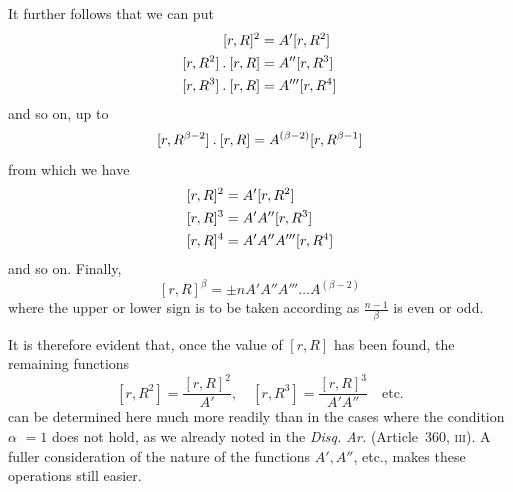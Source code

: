 It further follows that we can put
\[
\begin{aligned}
\relax[r,R]^2&=A'[r,R^2]\\
\relax[r,R^2]\mathbin{.}[r,R]&=A''[r,R^3]\\
\relax[r,R^3]\mathbin{.}[r,R]&=A'''[r,R^4]
\end{aligned}
\]
and so on, up to
\[
[r,R^{\beta-2}]\mathbin{.}[r,R]=A^{(\beta-2)}[r,R^{\beta-1}]
\]
from which we have
\[
\begin{aligned}
\relax[r,R]^2&=A'[r,R^2]\\
\relax[r,R]^3&=A'A''[r,R^3]\\
\relax[r,R]^4&=A'A''A'''[r,R^4]
\end{aligned}
\]
and so on. Finally,
\[
[r,R]^\beta=\pm nA'A''A'''\dots A^{(\beta-2)}
\]
where the upper or lower sign is to be taken according as $\frac{n-1}\beta$ is even or odd.

It is therefore evident that, once the value of $[r,R]$ has been found, the remaining functions
\[
[r,R^2]=\frac{[r,R]^2}{A'},\quad[r,R^3]=\frac{[r,R]^3}{A'A''}\quad\text{etc.}
\]
can be determined here much more readily than in the cases where the condition $\alpha$ $=1$ does not hold,
as we already noted in the \emph{Disq. Ar.} (Article~360, \textsc{iii}). A fuller consideration of the nature of the functions $A',A''$, etc., makes these operations still easier.

